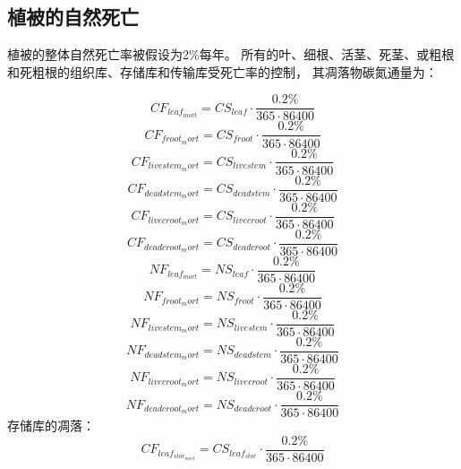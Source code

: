 \subsection{植被的自然死亡}\label{植被的自然死亡}
植被的整体自然死亡率被假设为2\%每年。
所有的叶、细根、活茎、死茎、或粗根和死粗根的组织库、存储库和传输库受死亡率的控制，
其凋落物碳氮通量为： 


\begin{equation}
  CF_{leaf_{mort}}=CS_{leaf}\cdot \frac{0.2\%}{365\cdot 86400}
\end{equation}
\begin{equation}
  CF_{froot_mort}=CS_{froot}\cdot \frac{0.2\%}{365\cdot 86400}
\end{equation}
\begin{equation}
  CF_{livestem_mort}=CS_{livestem}\cdot \frac{0.2\%}{365\cdot 86400}
\end{equation}
\begin{equation}
  CF_{deadstem_mort}=CS_{deadstem}\cdot \frac{0.2\%}{365\cdot 86400}
\end{equation}
\begin{equation}
  CF_{livecroot_mort}=CS_{livecroot}\cdot \frac{0.2\%}{365\cdot 86400}
\end{equation}
\begin{equation}
  CF_{deadcroot_mort}=CS_{deadcroot}\cdot \frac{0.2\%}{365\cdot 86400}
\end{equation}
\begin{equation}
  NF_{leaf_{mort}}=NS_{leaf}\cdot \frac{0.2\%}{365\cdot 86400}
\end{equation}
\begin{equation}
  NF_{froot_mort}=NS_{froot}\cdot \frac{0.2\%}{365\cdot 86400}
\end{equation}
\begin{equation}
  NF_{livestem_mort}=NS_{livestem}\cdot \frac{0.2\%}{365\cdot 86400}
\end{equation}
\begin{equation}
  NF_{deadstem_mort}=NS_{deadstem}\cdot \frac{0.2\%}{365\cdot 86400}
\end{equation}
\begin{equation}
  NF_{livecroot_mort}=NS_{livecroot}\cdot \frac{0.2\%}{365\cdot 86400}
\end{equation}
\begin{equation}
  NF_{deadcroot_mort}=NS_{deadcroot}\cdot \frac{0.2\%}{365\cdot 86400}
\end{equation}
存储库的凋落：
\begin{equation}
  CF_{leaf_{{stor}_{mort}}}=CS_{leaf_{stor}}\cdot \frac{0.2\%}{365\cdot 86400}
\end{equation}
